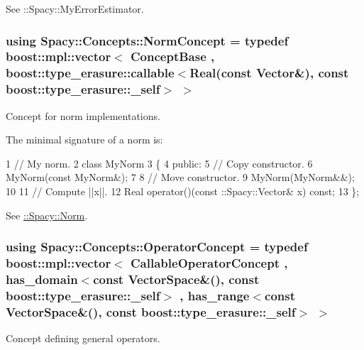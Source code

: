 See \+:\+:Spacy\+:\+:My\+Error\+Estimator. \hypertarget{group__ConceptGroup_ga8b6032c46f6e31840a2c956c6360549b_ga8b6032c46f6e31840a2c956c6360549b}{}
\subsubsection[{Norm\+Concept}]{\setlength{\rightskip}{0pt plus 5cm}using {\bf Spacy\+::\+Concepts\+::\+Norm\+Concept} = typedef boost\+::mpl\+::vector$<$ Concept\+Base , boost\+::type\+\_\+erasure\+::callable$<$Real(const Vector\&), const boost\+::type\+\_\+erasure\+::\+\_\+self$>$ $>$}\label{group__ConceptGroup_ga8b6032c46f6e31840a2c956c6360549b_ga8b6032c46f6e31840a2c956c6360549b}


Concept for norm implementations. 

\label{group__ConceptGroup_ga8b6032c46f6e31840a2c956c6360549b_NormConceptAnchor}%
\hypertarget{group__ConceptGroup_ga8b6032c46f6e31840a2c956c6360549b_NormConceptAnchor}{}%
The minimal signature of a norm is\+: 
\begin{DoxyCode}
1 // My norm.
2 class MyNorm
3 \{
4 public:
5   // Copy constructor.
6   MyNorm(const MyNorm&);
7 
8   // Move constructor.
9   MyNorm(MyNorm&&);
10 
11   // Compute ||x||.
12   Real operator()(const ::Spacy::Vector& x) const;
13 \};
\end{DoxyCode}


See \hyperlink{group__SpacyGroup_gaf4f33b11d657c48566d961a013c92bd1_NormAnchor}{\+:\+:Spacy\+:\+:Norm}. \hypertarget{group__ConceptGroup_ga7d984281b647a6d8e4c0a7ea5faeb90e_ga7d984281b647a6d8e4c0a7ea5faeb90e}{}
\subsubsection[{Operator\+Concept}]{\setlength{\rightskip}{0pt plus 5cm}using {\bf Spacy\+::\+Concepts\+::\+Operator\+Concept} = typedef boost\+::mpl\+::vector$<$ Callable\+Operator\+Concept , has\+\_\+domain$<$const Vector\+Space\&(), const boost\+::type\+\_\+erasure\+::\+\_\+self$>$ , has\+\_\+range$<$const Vector\+Space\&(), const boost\+::type\+\_\+erasure\+::\+\_\+self$>$ $>$}\label{group__ConceptGroup_ga7d984281b647a6d8e4c0a7ea5faeb90e_ga7d984281b647a6d8e4c0a7ea5faeb90e}


Concept defining general operators. 


